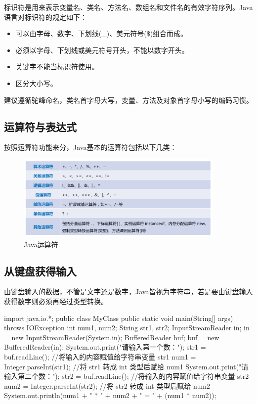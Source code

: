 标识符是用来表示变量名、类名、方法名、数组名和文件名的有效字符序列。Java语言对标识符的规定如下：
  
\begin{itemize}
\item 可以由字母、数字、下划线(\_)、美元符号(\$)组合而成。
\item 必须以字母、下划线或美元符号开头，不能以数字开头。
\item 关键字不能当标识符使用。
\item 区分大小写。
\end{itemize}

建议遵循驼峰命名，类名首字母大写，变量、方法及对象首字母小写的编码习惯。

\subsection{运算符与表达式}

按照运算符功能来分，Java基本的运算符包括以下几类：

\begin{figure}[htb]
\centering
\includegraphics[width=0.9\textwidth]{images/Java-language-basic-and-flow-control/fig-java-operators.pdf}
\caption{Java运算符}
\label{fig:java-operators}
\end{figure}
  
\subsection{从键盘获得输入}

由键盘输入的数据，不管是文字还是数字，Java皆视为{\hei\Red 字符串}，若是要由键盘输入获得数字则必须再经过类型转换。


\begin{javaCode}
  import java.io.*;
  public class MyClass {
    public static void main(String[] args) throws IOException {
      int num1, num2;
      String str1, str2;
      InputStreamReader in;
      in = new InputStreamReader(System.in);
      BufferedReader buf;
      buf = new BufferedReader(in);
      System.out.print("请输入第一个数：");
      str1 = buf.readLine();         //将输入的内容赋值给字符串变量 str1
      num1 = Integer.parseInt(str1);   //将 str1 转成 int 类型后赋给 num1
      System.out.print("请输入第二个数：");
      str2 = buf.readLine();         //将输入的内容赋值给字符串变量 str2
      num2 = Integer.parseInt(str2);   //将 str2 转成 int 类型后赋给 num2
      System.out.println(num1 + " * " + num2 + " = " + (num1 * num2));
    }
  }
\end{javaCode}

